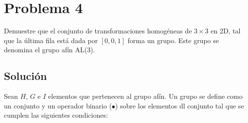 \section*{Problema 4}
\setcounter{equation}{0}
Demuestre que el conjunto de transformaciones homogéneas de $3 \times 3$ en 2D, tal que
la última fila está dada por $[0,0,1]$ forma un grupo. Este grupo se denomina el grupo afín AL(3).

\subsection*{Solución}
Sean $H$, $G$ e $I$ elementos que pertenecen al grupo afín.
Un grupo se define como un conjunto y un operador binario ($\bullet$) 
sobre los elementos dl conjunto tal que se cumplen las siguientes condiciones:


